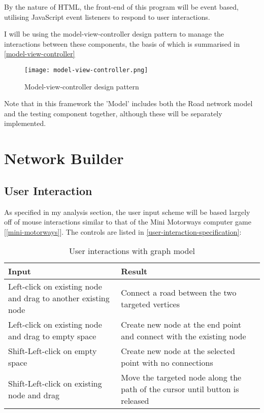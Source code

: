     By the nature of HTML, the front-end of this program will be event based, utilising JavaScript event listeners to respond to user interactions.

    I will be using the model-view-controller design pattern to manage the interactions between these components, the basis of which is summarised in \autoref{model-view-controller}

    \begin{figure}[ht]
        \centering
        \texttt{[image: model-view-controller.png]}
        \caption{Model-view-controller design pattern}
        \label{model-view-controller}
    \end{figure}

    Note that in this framework the 'Model' includes both the Road network model and the testing component together, although these will be separately implemented.

\section{Network Builder}

    \subsection{User Interaction}

    As specified in my analysis section, the user input scheme will be based largely off of mouse interactions similar to that of the Mini Motorways computer game [\autoref{mini-motorways}]. The controls are listed in \autoref{user-interaction-specification}:

    \begin{table}[ht]
        \centering
        \begin{tabular}{|p{}|p{}|}
            \hline
            \textbf{Input} & \textbf{Result}\\
            \hline
            Left-click on existing node and drag to another existing node & Connect a road between the two targeted vertices\\\hline
            Left-click on existing node and drag to empty space & Create new node at the end point and connect with the existing node\\\hline
            Shift-Left-click on empty space & Create new node at the selected point with no connections\\\hline
            Shift-Left-click on existing node and drag & Move the targeted node along the path of the cursor until button is released\\\hline
        \end{tabular}
        \caption{User interactions with graph model}
        \label{user-interaction-specification}
    \end{table}

